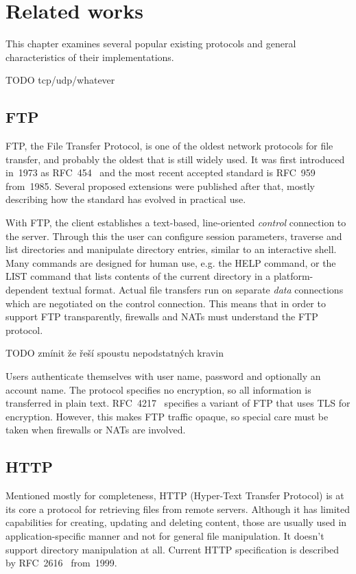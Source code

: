 
\chapter{Related works}

This chapter examines several popular existing protocols and general characteristics
of their implementations.

TODO tcp/udp/whatever

\section{FTP}

FTP, the File Transfer Protocol, is one of the oldest network protocols for file transfer, and probably the
oldest that is still widely used. It was first introduced in~1973 as RFC~454~\cite{rfc454} and the most recent
accepted standard is RFC~959~\cite{rfc959} from~1985. Several proposed extensions were published after that,
mostly describing how the standard has evolved in practical use.

With FTP, the client establishes a text-based, line-oriented {\it control} connection to the server. Through this
the user can configure session parameters, traverse and list directories and manipulate directory entries,
similar to an interactive shell. Many commands are designed for human use, e.g. the HELP command, or the LIST
command that lists contents of the current directory in a platform-dependent textual format. Actual file
transfers run on separate {\it data} connections which are negotiated on the control connection. This means that
in order to support FTP transparently, firewalls and NATs must understand the FTP protocol.

TODO zmínit že řeší spoustu nepodstatných kravin

Users authenticate themselves with user name, password and optionally an account name. The protocol specifies
no encryption, so all information is transferred in plain text. RFC~4217~\cite{rfc4217} specifies a variant of
FTP that uses TLS for encryption. However, this makes FTP traffic opaque, so special care must be taken when
firewalls or NATs are involved.

\section{HTTP}

Mentioned mostly for completeness, HTTP (Hyper-Text Transfer Protocol) is at its core a protocol for
retrieving files from remote servers. Although it has limited capabilities for creating, updating and deleting
content, those are usually used in application-specific manner and not for general file manipulation. It
doesn't support directory manipulation at all. Current HTTP specification is described by
RFC~2616~\cite{rfc2616} from~1999.

